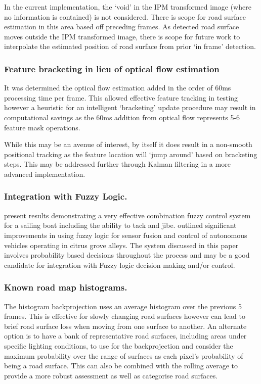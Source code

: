 \documentclass[]{aiaa-tc}%
\begin{document}
In the current implementation, the `void' in the IPM transformed image (where no information is contained) is not considered. There is scope for road surface estimation in this area based off preceding frames. As detected road surface moves outside the IPM transformed image, there is scope for future work to interpolate the estimated position of road surface from prior `in frame' detection.

\subsubsection{Feature bracketing in lieu of optical flow estimation}

It was determined the optical flow estimation added in the order of 60ms processing time per frame. This allowed effective feature tracking in testing however a heuristic for an intelligent `bracketing' update procedure may result in computational savings as the 60ms addition from optical flow represents 5-6 feature mask operations.

While this may be an avenue of interest, by itself it does result in a non-smooth positional tracking as the feature location will `jump around' based on bracketing steps. This may be addressed further through Kalman filtering in a more advanced implementation.

\subsubsection{Integration with Fuzzy Logic.} \citet{fuzzySail} present results demonstrating a very effective combination fuzzy control system for a sailing boat including the ability to tack and jibe. \citet{fuzzyGrove} outlined significant improvements in using fuzzy logic for sensor fusion and control of autonomous vehicles operating in citrus grove alleys. The system discussed in this paper involves probability based decisions throughout the process and may be a good candidate for integration with Fuzzy logic decision making and/or control.

\subsubsection{Known road map histograms.} The histogram backprojection uses an average histogram over the previous 5 frames. This is effective for slowly changing road surfaces however can lead to brief road surface loss when moving from one surface to another. An alternate option is to have a bank of representative road surfaces, including areas under specific lighting conditions, to use for the backprojection and consider the maximum probability over the range of surfaces as each pixel's probability of being a road surface. This can also be combined with the rolling average to provide a more robust assessment as well as categorise road surfaces. 
\end{document}
